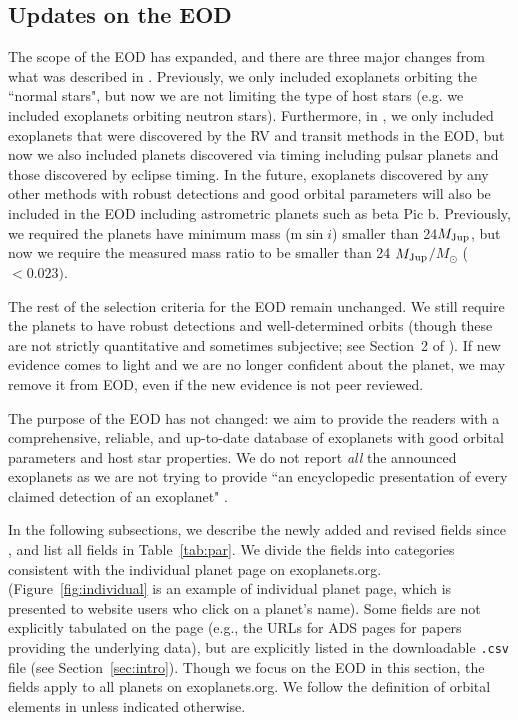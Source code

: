 \documentclass[11pt,preprint]{aastex}
\def\msun{M_{\odot}}
\def\mjup{$M_{\rm Jup}$}
\begin{document}
\begin{CJK*}{UTF8}{gbsn}
\section{Updates on the EOD}\label{sec:update}

The scope of the EOD has expanded, and there are three major changes
from what was described in \cite{Wright2011}. Previously, we only
included exoplanets orbiting the ``normal stars", but now we are not
limiting the type of host stars (e.g. we included exoplanets orbiting
neutron stars). Furthermore, in \cite{Wright2011}, we only included
exoplanets that were discovered by the RV and transit methods in the
EOD, but now we also included planets discovered via timing including pulsar planets and those discovered by eclipse timing. In the
future, exoplanets discovered by any other methods with robust
detections and good orbital parameters will also be included in the
EOD including astrometric planets such as beta Pic b. Previously, we required the planets have minimum mass (m$\sin{i}$) smaller than 24\mjup, but now we require the measured mass ratio to be smaller than 24
\mjup$/\msun$ ($< 0.023)$.

The rest of the selection criteria for the EOD remain unchanged. We
still require the planets to have robust detections and well-determined
orbits (though these are not strictly quantitative and sometimes subjective; see Section~2 of
\citealt{Wright2011}). If new evidence comes to light and we are no
longer confident about the planet, we may remove it from EOD, even if the new evidence is not peer reviewed.

The purpose of the EOD has not changed: we aim to provide the readers
with a comprehensive, reliable, and up-to-date database of exoplanets
with good orbital parameters and host star properties. We do not
report \textit{all} the announced exoplanets as we are not trying to
provide ``an encyclopedic presentation of every claimed detection of an
exoplanet" \citep{Wright2011}.

In the following subsections, we describe the newly added and revised
fields since \cite{Wright2011}, and list all fields in
Table~\ref{tab:par}. We divide the fields into categories consistent with the individual planet page on
exoplanets.org. (Figure~\ref{fig:individual} is an example of
individual planet page, which is presented to website users who click on a planet's name). Some fields are not explicitly tabulated on
the page (e.g., the URLs for ADS pages for papers providing the underlying data), but are explicitly listed in the
downloadable {\tt .csv} file (see Section~\ref{sec:intro}). Though we
focus on the EOD in this section, the fields apply to all planets on
exoplanets.org. We follow the definition of orbital elements in
\cite{Wright2013} unless indicated otherwise.



\end{CJK*}
\end{document}
